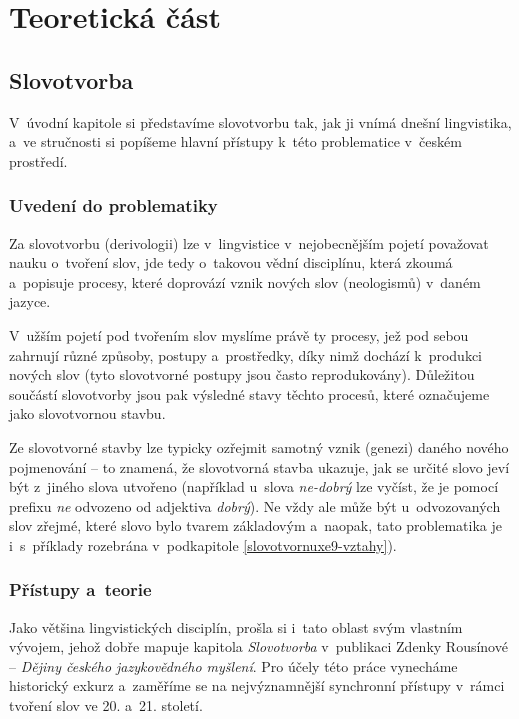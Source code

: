 \part{Teoretická část}

\hypertarget{slovotvorba}{%
\chapter{Slovotvorba}\label{slovotvorba}}

V~úvodní kapitole si představíme slovotvorbu tak, jak ji vnímá dnešní
lingvistika, a~ve stručnosti si popíšeme hlavní přístupy k~této
problematice v~českém prostředí.

\hypertarget{uvedenuxed-do-problematiky}{%
\section{Uvedení do problematiky}\label{uvedenuxed-do-problematiky}}

Za slovotvorbu (derivologii) lze v~lingvistice v~nejobecnějším pojetí
považovat nauku o~tvoření slov, jde tedy o~takovou vědní disciplínu,
která zkoumá a~popisuje procesy, které doprovází vznik nových slov
(neologismů) v~daném jazyce.

V~užším pojetí pod tvořením slov myslíme právě ty procesy, jež pod sebou
zahrnují různé způsoby, postupy a~prostředky, díky nimž dochází
k~produkci nových slov (tyto slovotvorné postupy jsou často
reprodukovány). Důležitou součástí slovotvorby jsou pak výsledné stavy
těchto procesů, které označujeme jako slovotvornou stavbu.
\parencite[92]{dokulil00}

Ze slovotvorné stavby lze typicky ozřejmit samotný vznik (genezi) daného
nového pojmenování -- to znamená, že slovotvorná stavba ukazuje, jak se
určité slovo jeví být z~jiného slova utvořeno (například u~slova
\emph{ne-dobrý} lze vyčíst, že je pomocí prefixu \emph{ne} odvozeno od
adjektiva \emph{dobrý}). Ne vždy ale může být u~odvozovaných slov
zřejmé, které slovo bylo tvarem základovým a~naopak, tato problematika
je i~s~příklady rozebrána v~podkapitole \ref{slovotvornuxe9-vztahy}).
\parencite[92--93]{dokulil00}

\hypertarget{pux159uxedstupy-a-teorie}{%
\section{Přístupy a~teorie}\label{pux159uxedstupy-a-teorie}}

Jako většina lingvistických disciplín, prošla si i~tato oblast svým
vlastním vývojem, jehož dobře mapuje kapitola \emph{Slovotvorba}
v~publikaci Zdenky Rousínové -- \emph{Dějiny českého jazykovědného
myšlení}. Pro účely této práce vynecháme historický exkurz a~zaměříme se
na nejvýznamnější synchronní přístupy v~rámci tvoření slov ve 20. a~21.
století.

